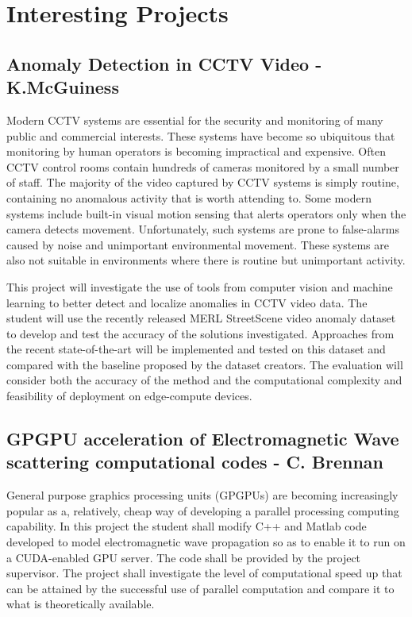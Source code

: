 \documentclass[a4paper]{article}
\begin{document}
\section{Interesting Projects}
\subsection{Anomaly Detection in CCTV Video - K.McGuiness}

Modern CCTV systems are essential for the security and monitoring of many public
and commercial interests. These systems have become so ubiquitous that monitoring
by human operators is becoming impractical and expensive. Often CCTV control rooms
contain hundreds of cameras monitored by a small number of staff.  The majority of
the video captured by CCTV systems is simply routine, containing no anomalous activity
that is worth attending to. Some modern systems include built-in visual motion
sensing that alerts operators only when the camera detects movement. Unfortunately,
such systems are prone to false-alarms caused by noise and unimportant environmental
movement. These systems are also not suitable in environments where there is
routine but unimportant activity.

This project will investigate the use of tools from computer vision and machine
learning to better detect and localize anomalies in CCTV video data. The
student will use the recently released MERL StreetScene video anomaly dataset
to develop and test the accuracy of the solutions investigated. Approaches from
the recent state-of-the-art will be implemented and tested on this dataset and
compared with the baseline proposed by the dataset creators. The evaluation will
consider both the accuracy of the method and the computational complexity and
feasibility of deployment on edge-compute devices.

\subsection{GPGPU acceleration of Electromagnetic Wave scattering computational
codes - C. Brennan}

General purpose graphics processing units (GPGPUs) are becoming increasingly popular as a, relatively, cheap way of developing a parallel processing computing capability. In this project the student shall modify C++ and Matlab code developed to model electromagnetic wave propagation so as to enable it to run on a CUDA-enabled GPU server.  The code shall be provided by the project supervisor. The project shall investigate the level of computational speed up that can be attained by
the successful use of parallel computation and compare it to what is theoretically available.
\end{document}
